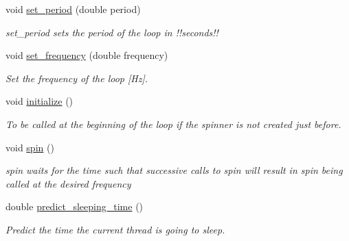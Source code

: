\begin{DoxyCompactItemize}
\item 
void \hyperlink{classreal__time__tools_1_1Spinner_ac945d6df02f33e75f499922d23838408}{set\+\_\+period} (double period)
\begin{DoxyCompactList}\small\item\em set\+\_\+period sets the period of the loop in !!seconds!! \end{DoxyCompactList}\item 
void \hyperlink{classreal__time__tools_1_1Spinner_afa4e24e5dbbbfa2e0d694ef2e3fa3bb8}{set\+\_\+frequency} (double frequency)
\begin{DoxyCompactList}\small\item\em Set the frequency of the loop \mbox{[}Hz\mbox{]}. \end{DoxyCompactList}\item 
\mbox{\label{classreal__time__tools_1_1Spinner_aadeb66828ba2635858876491f1ffac11}} 
void \hyperlink{classreal__time__tools_1_1Spinner_aadeb66828ba2635858876491f1ffac11}{initialize} ()
\begin{DoxyCompactList}\small\item\em To be called at the beginning of the loop if the spinner is not created just before. \end{DoxyCompactList}\item 
\mbox{\label{classreal__time__tools_1_1Spinner_aa07d4fa32ead44008daa73663508139d}} 
void \hyperlink{classreal__time__tools_1_1Spinner_aa07d4fa32ead44008daa73663508139d}{spin} ()
\begin{DoxyCompactList}\small\item\em spin waits for the time such that successive calls to spin will result in spin being called at the desired frequency \end{DoxyCompactList}\item 
\mbox{\label{classreal__time__tools_1_1Spinner_a5a55ae6d3b5104b5f23e0f153851eb1d}} 
double \hyperlink{classreal__time__tools_1_1Spinner_a5a55ae6d3b5104b5f23e0f153851eb1d}{predict\+\_\+sleeping\+\_\+time} ()
\begin{DoxyCompactList}\small\item\em Predict the time the current thread is going to sleep. \end{DoxyCompactList}\end{DoxyCompactItemize}
